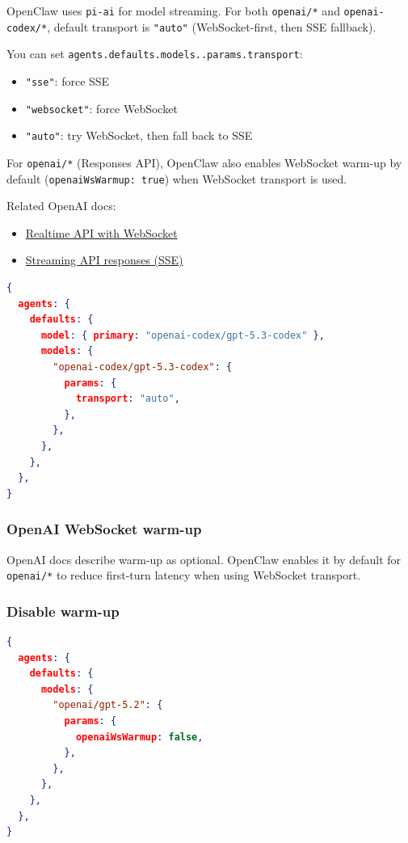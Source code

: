 OpenClaw uses \texttt{pi-ai} for model streaming. For both \texttt{openai/*} and
\texttt{openai-codex/*}, default transport is \texttt{"auto"} (WebSocket-first, then SSE
fallback).

You can set \texttt{agents.defaults.models..params.transport}:

\begin{itemize}
  \item \texttt{"sse"}: force SSE
  \item \texttt{"websocket"}: force WebSocket
  \item \texttt{"auto"}: try WebSocket, then fall back to SSE
\end{itemize}


For \texttt{openai/*} (Responses API), OpenClaw also enables WebSocket warm-up by
default (\texttt{openaiWsWarmup: true}) when WebSocket transport is used.

Related OpenAI docs:

\begin{itemize}
  \item \href{https://platform.openai.com/docs/guides/realtime-websocket}{Realtime API with WebSocket}
  \item \href{https://platform.openai.com/docs/guides/streaming-responses}{Streaming API responses (SSE)}
\end{itemize}


\begin{lstlisting}[language=json]
{
  agents: {
    defaults: {
      model: { primary: "openai-codex/gpt-5.3-codex" },
      models: {
        "openai-codex/gpt-5.3-codex": {
          params: {
            transport: "auto",
          },
        },
      },
    },
  },
}
\end{lstlisting}


\subsubsection{OpenAI WebSocket warm-up}


OpenAI docs describe warm-up as optional. OpenClaw enables it by default for
\texttt{openai/*} to reduce first-turn latency when using WebSocket transport.

\subsubsection{Disable warm-up}


\begin{lstlisting}[language=json]
{
  agents: {
    defaults: {
      models: {
        "openai/gpt-5.2": {
          params: {
            openaiWsWarmup: false,
          },
        },
      },
    },
  },
}
\end{lstlisting}


